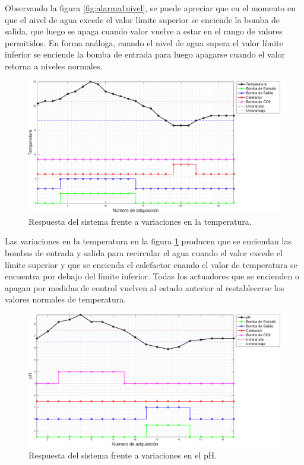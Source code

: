 Observando la figura \ref{fig:alarma1nivel}, se puede apreciar que en el momento en que el nivel de agua excede el valor límite superior se enciende la bomba de salida, que luego se apaga cuando valor vuelve a estar en el rango de valores permitidos.  En forma análoga, cuando el nivel de agua supera el valor límite inferior se enciende la bomba de entrada para luego apagarse cuando el valor retorna a niveles normales.

\begin{figure}[h]
\centering
    \includegraphics[width=\textwidth]{./Figures/plot1Temp.pdf}
	\caption{Respuesta del sistema frente a variaciones en la temperatura.}
	\label{fig:alarma1Temp}
\end{figure}

Las variaciones en la temperatura en la figura \ref{fig:alarma1Temp} producen que se enciendan las bombas de entrada y salida para recircular el agua cuando el valor excede el límite superior y que se encienda el calefactor cuando el valor de temperatura se encuentra por debajo del límite inferior.  Todas los actuadores que se encienden o apagan por medidas de control vuelven al estado anterior al restablecerse los valores normales de temperatura.

\begin{figure}[h]
\centering
    \includegraphics[width=\textwidth]{./Figures/plot1pH.pdf}
	\caption{Respuesta del sistema frente a variaciones en el pH.}
	\label{fig:alarma1pH}
\end{figure}

